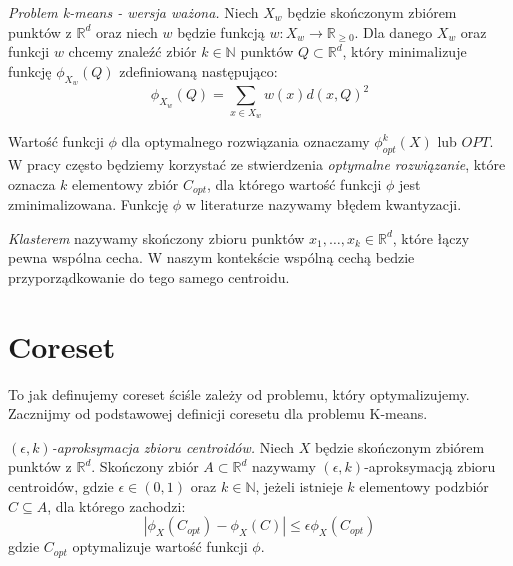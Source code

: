 \begin{definition}
    \emph{Problem k-means - wersja ważona.} Niech $X_{w}$ będzie skończonym zbiórem punktów z $\mathbb{R}^{d}$ oraz niech $w$ będzie funkcją $w: X_{w} \rightarrow \mathbb{R}_{\ge0}$. 
    Dla danego $X_{w}$ oraz funkcji $w$ chcemy znaleźć zbiór $k \in \mathbb{N}$ punktów $Q \subset \mathbb{R}^{d}$, który minimalizuje funkcję $\phi_{X_{w}}(Q)$ zdefiniowaną następująco:
    \begin{equation}
        \phi_{X_{w}}(Q) = \sum_{x \in X_{w}} w(x) d(x, Q)^{2}
    \end{equation}
\end{definition}

\noindent
Wartość funkcji $\phi$ dla optymalnego rozwiązania oznaczamy $\phi_{opt}^{k}(X)$ lub $OPT$.
W pracy często będziemy korzystać ze stwierdzenia \textit{optymalne rozwiązanie}, które oznacza $k$ elementowy zbiór $C_{opt}$, dla którego wartość funkcji $\phi$ jest zminimalizowana. 
Funkcję $\phi$ w literaturze nazywamy błędem kwantyzacji.

\begin{definition}
    \emph{Klasterem} nazywamy skończony zbioru punktów $x_{1}, \dots, x_{k} \in \mathbb{R}^{d}$, które łączy pewna wspólna cecha.
    W naszym kontekście wspólną cechą bedzie przyporządkowanie do tego samego centroidu.
\end{definition}

\section{Coreset}

To jak definujemy coreset ściśle zależy od problemu, który optymalizujemy.
Zacznijmy od podstawowej definicji coresetu dla problemu K-means.

\begin{definition}
    \emph{$(\epsilon, k)$-aproksymacja zbioru centroidów.} 
    Niech $X$ będzie skończonym zbiórem punktów z $\mathbb{R}^{d}$.
    Skończony zbiór $A \subset \mathbb{R}^{d}$ nazywamy $(\epsilon, k)$-aproksymacją zbioru centroidów, gdzie $\epsilon \in (0, 1)$ oraz $k \in \mathbb{N}$, jeżeli istnieje $k$ elementowy podzbiór $C \subseteq A$, dla którego zachodzi:
    \begin{equation}
        |\phi_{X}(C_{opt}) - \phi_{X}(C)| \leq \epsilon\phi_{X}(C_{opt})
    \end{equation}
    gdzie $C_{opt}$ optymalizuje wartość funkcji $\phi$.
\end{definition}

